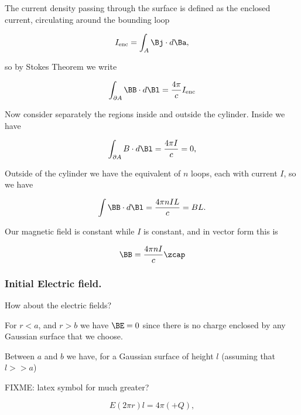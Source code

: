 The current density passing through the surface is defined as the enclosed current, circulating around the bounding loop

\begin{equation}\label{eqn:relativisticElectrodynamicsT5:50}
I_{\text{enc}} = \int_A \Bj \cdot d\Ba,
\end{equation}

so by Stokes Theorem we write

\begin{equation}\label{eqn:relativisticElectrodynamicsT5:70}
\int_{\partial A} \BB \cdot d\Bl = \frac{4 \pi}{c} I_{\text{enc}}
\end{equation}

Now consider separately the regions inside and outside the cylinder.  Inside we have

\begin{equation}\label{eqn:relativisticElectrodynamicsT5:71}
\int_{\partial A} B \cdot d \Bl = \frac{4 \pi I }{c} = 0,
\end{equation}

Outside of the cylinder we have the equivalent of $n$ loops, each with current $I$, so we have

\begin{equation}\label{eqn:relativisticElectrodynamicsT5:90}
\int \BB \cdot d\Bl = \frac{4 \pi n I L}{c} = B L.
\end{equation}

Our magnetic field is constant while $I$ is constant, and in vector form this is

\begin{equation}\label{eqn:relativisticElectrodynamicsT5:110}
\BB = \frac{4 \pi n I}{c} \zcap
\end{equation}

\subsubsection{Initial Electric field.}

How about the electric fields?

For $r < a$, and $r > b$ we have $\BE = 0$ since there is no charge enclosed by any Gaussian surface that we choose.

Between $a$ and $b$ we have, for a Gaussian surface of height $l$ (assuming that $l >> a$)

FIXME: latex symbol for much greater?

\begin{equation}\label{eqn:relativisticElectrodynamicsT5:130}
E (2 \pi r) l = 4 \pi (+Q),
\end{equation}

